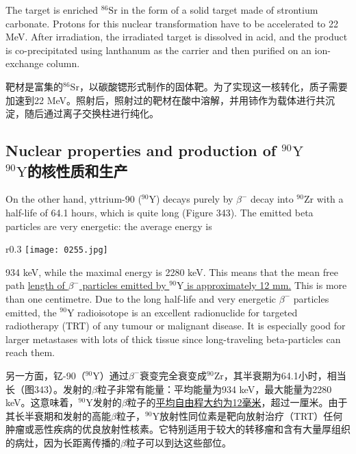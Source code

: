 \documentclass[dvipsnames, svgnames,a4paper,11pt]{article}
\begin{document}
The target is enriched \(\mathrm{^{86}Sr}\) in the form of a solid target made of strontium carbonate. Protons for this nuclear transformation have to be accelerated to 22 MeV. After irradiation, the irradiated target is dissolved in acid, and the product is co-precipitated using lanthanum as the carrier and then purified on an ion-exchange column.

靶材是富集的\(\mathrm{^{86}Sr}\)，以碳酸锶形式制作的固体靶。为了实现这一核转化，质子需要加速到22 MeV。照射后，照射过的靶材在酸中溶解，并用铈作为载体进行共沉淀，随后通过离子交换柱进行纯化。

\subsection{Nuclear properties and production of \(\mathrm{^{90}Y}\) \\\(\mathrm{^{90}Y}\)的核性质和生产}  

On the other hand, yttrium-90 (\(\mathrm{^{90}Y}\)) decays purely by \(\beta^{-}\) decay into \(\mathrm{^{90}Zr}\) with a half-life of 64.1 hours, which is quite long (Figure 343). The emitted beta particles are very energetic: the average energy is 
\begin{wrapfigure}{r}{0.3\textwidth}
	\centering
    \texttt{[image: 0255.jpg]}  
     \label{fig343}
\end{wrapfigure}
934 keV, while the maximal energy is 2280 keV. This means that the mean free path \underline{length of \(\beta^{-}\) particles emitted by \(\mathrm{^{90}Y}\) is approximately 12 mm.} This is more than one centimetre. Due to the long half-life and very energetic \(\beta^{-}\) particles emitted, the \(\mathrm{^{90}Y}\) radioisotope is an excellent radionuclide for targeted radiotherapy (TRT) of any tumour or malignant disease. It is especially good for larger metastases with lots of thick tissue since long-traveling beta-particles can reach them.

另一方面，钇-90（\(\mathrm{^{90}Y}\)）通过\(\beta^{-}\)衰变完全衰变成\(\mathrm{^{90}Zr}\)，其半衰期为64.1小时，相当长（图343）。发射的\(\beta\)粒子非常有能量：平均能量为934 keV，最大能量为2280 keV。这意味着，\(\mathrm{^{90}Y}\)发射的\(\beta\)粒子的\underline{平均自由程大约为12毫米}，超过一厘米。由于其长半衰期和发射的高能\(\beta\)粒子，\(\mathrm{^{90}Y}\)放射性同位素是靶向放射治疗（TRT）任何肿瘤或恶性疾病的优良放射性核素。它特别适用于较大的转移瘤和含有大量厚组织的病灶，因为长距离传播的\(\beta\)粒子可以到达这些部位。
\end{document}
